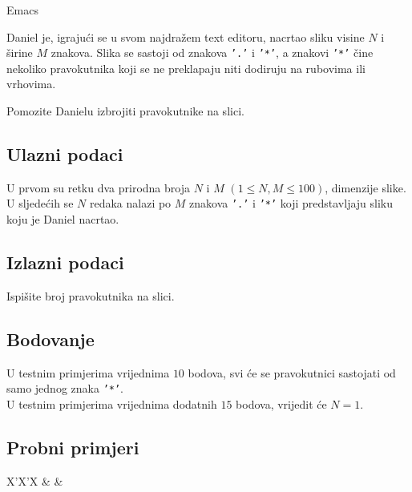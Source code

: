 \begin{statement}[
  problempoints=50,
  timelimit=1 sekunda,
  memorylimit=512 MiB,
]{Emacs}


Daniel je, igrajući se u svom najdražem text editoru, nacrtao sliku visine $N$
i širine $M$ znakova. Slika se sastoji od znakova \texttt{'.'} i
\texttt{'*'}, a znakovi \texttt{'*'} čine nekoliko pravokutnika koji se ne
preklapaju niti dodiruju na rubovima ili vrhovima.

Pomozite Danielu izbrojiti pravokutnike na slici.

\subsection*{Ulazni podaci}
U prvom su retku dva prirodna broja $N$ i $M$ $(1 \le N, M \le 100)$, dimenzije
slike.\\
U sljedećih se $N$ redaka nalazi po $M$ znakova \texttt{'.'} i
\texttt{'*'} koji predstavljaju sliku koju je Daniel nacrtao.

\subsection*{Izlazni podaci}
Ispišite broj pravokutnika na slici.

\subsection*{Bodovanje}
U testnim primjerima vrijednima $10$ bodova, svi će se pravokutnici sastojati
od samo jednog znaka \texttt{'*'}.\\
U testnim primjerima vrijednima dodatnih $15$ bodova, vrijedit će $N = 1$.

\subsection*{Probni primjeri}
\begin{tabularx}{\textwidth}{X'X'X}
 &
 &
\end{tabularx}

\end{statement}


